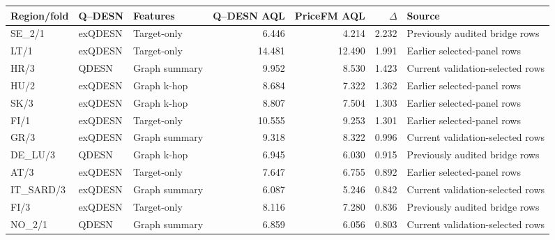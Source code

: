 \begin{tabular}{lllrrrl}
\toprule
Region/fold & Q--DESN & Features & Q--DESN AQL & PriceFM AQL & $\Delta$ & Source \\
\midrule
SE\_2/1 & exQDESN & Target-only & 6.446 & 4.214 & 2.232 & Previously audited bridge rows \\
LT/1 & exQDESN & Target-only & 14.481 & 12.490 & 1.991 & Earlier selected-panel rows \\
HR/3 & QDESN & Graph summary & 9.952 & 8.530 & 1.423 & Current validation-selected rows \\
HU/2 & exQDESN & Graph k-hop & 8.684 & 7.322 & 1.362 & Earlier selected-panel rows \\
SK/3 & exQDESN & Graph k-hop & 8.807 & 7.504 & 1.303 & Earlier selected-panel rows \\
FI/1 & exQDESN & Target-only & 10.555 & 9.253 & 1.301 & Earlier selected-panel rows \\
GR/3 & exQDESN & Graph summary & 9.318 & 8.322 & 0.996 & Current validation-selected rows \\
DE\_LU/3 & QDESN & Graph k-hop & 6.945 & 6.030 & 0.915 & Previously audited bridge rows \\
AT/3 & exQDESN & Target-only & 7.647 & 6.755 & 0.892 & Earlier selected-panel rows \\
IT\_SARD/3 & exQDESN & Graph summary & 6.087 & 5.246 & 0.842 & Current validation-selected rows \\
FI/3 & exQDESN & Target-only & 8.116 & 7.280 & 0.836 & Previously audited bridge rows \\
NO\_2/1 & QDESN & Graph summary & 6.859 & 6.056 & 0.803 & Current validation-selected rows \\
\bottomrule
\end{tabular}
